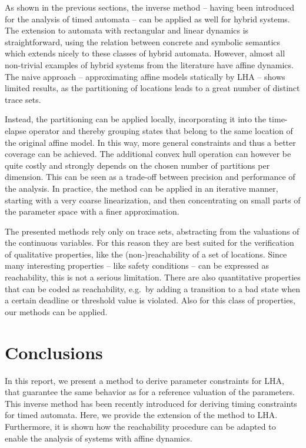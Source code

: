 \documentclass{llncs}
\begin{document}
As shown in the previous sections, the inverse method -- having been
introduced for the analysis of timed automata -- can be applied as
well for hybrid systems. The extension to automata with rectangular
and linear dynamics is straightforward, using the relation between
concrete and symbolic semantics which extends nicely to these classes
of hybrid automata. However, almost all non-trivial examples of hybrid
systems from the literature have affine dynamics. The naive approach
-- approximating affine models statically by LHA -- shows limited
results, as the partitioning of locations leads to a great number of
distinct trace sets.

Instead, the partitioning can be applied locally, incorporating it
into the time-elapse operator and thereby grouping states that belong
to the same location of the original affine model. In this way, more
general constraints and thus a better coverage can be achieved. The
additional convex hull operation can however be quite costly and
strongly depends on the chosen number of partitions per
dimension. This can be seen as a trade-off between precision and
performance of the analysis. In practice, the method can be applied in
an iterative manner, starting with a very coarse linearization, and
then concentrating on small parts of the parameter space with a finer
approximation.

The presented methods rely only on trace sets, abstracting from the
valuations of the continuous variables. For this reason they are best
suited for the verification of qualitative properties, like the
(non-)reachability of a set of locations. Since many interesting
properties -- like safety conditions -- can be expressed as
reachability, this is not a serious limitation. There are also
quantitative properties that can be coded as reachability, e.g.~by
adding a transition to a bad state when a certain deadline or
threshold value is violated. Also for this class of properties, our
methods can be applied.

\section{Conclusions}\label{sec:concl}
In this report, we present a method to derive parameter constraints
for LHA, that guarantee the same behavior as for a reference valuation
of the parameters. This inverse method has been recently introduced
for deriving timing constraints for timed automata. Here, we provide
the extension of the method to LHA. Furthermore, it is shown how the
reachability procedure can be adapted to enable the analysis of
systems with affine dynamics. 
\end{document}
